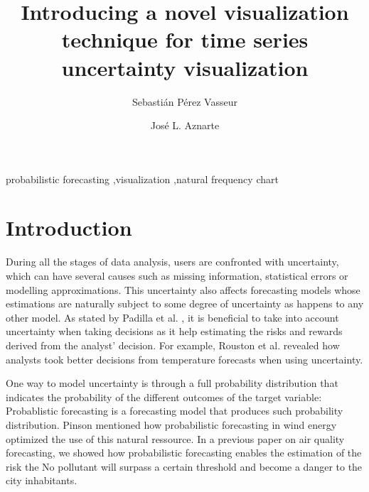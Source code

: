\documentclass[a4paper,3p,sort&compress]{elsarticle}
\begin{document}
\linenumbers

\newcommand{\no}{NO\textsubscript{2}\xspace}

\begin{frontmatter}

  \title{Introducing a novel visualization technique for time series uncertainty visualization}


  \author{Sebasti\'an P\'erez Vasseur}
  \author{Jos\'e L. Aznarte}
  \address{Artificial Intelligence Department\\Universidad Nacional de
    Educaci\'on a Distancia --- UNED\\c/ Juan del Rosal, 16, Madrid, Spain}
  

\begin{abstract}
  
\end{abstract}

\begin{keyword}
probabilistic forecasting \sep visualization \sep natural frequency chart
\end{keyword}

\end{frontmatter}


\section{Introduction}
\label{sec:intro}

During all the stages of data analysis, users are confronted with uncertainty, which can have 
several causes such as missing information, statistical errors or modelling approximations.
This uncertainty also affects forecasting models whose estimations are naturally 
subject to some degree of uncertainty as happens to any other model. 
As stated by Padilla et al. \cite{padilla_uncertainty_2021}, it is beneficial to take into account uncertainty 
when taking decisions as it help estimating the risks and rewards derived from the analyst'
decision. For example, Rouston et al. \cite{roulston_laboratory_2006} 
revealed how analysts 
took better decisions from temperature forecasts when using uncertainty. 

One way to model uncertainty is through a full 
probability distribution that indicates the probability of the different outcomes of the target variable:
Probablistic forecasting is a forecasting model that produces such probability distribution.
Pinson mentioned how probabilistic forecasting 
in wind energy optimized the use of this natural ressource. In a previous paper on air quality forecasting, we showed 
how probabilistic forecasting enables the estimation of the risk the No pollutant will surpass a certain threshold 
and become a danger to the city inhabitants. 
\end{document}
